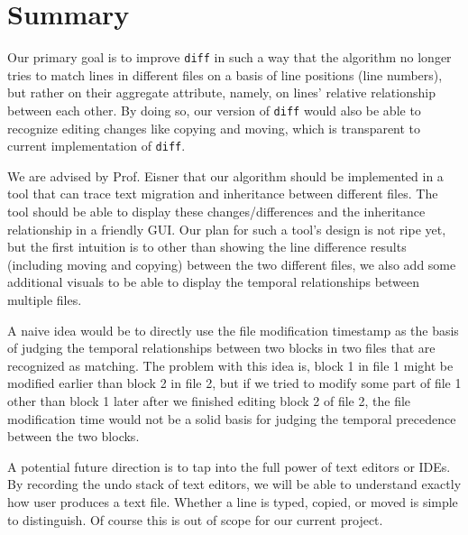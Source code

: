 \documentclass{article}
\begin{document}
\section{Summary}
Our primary goal is to improve \texttt{diff} in such a way that the algorithm no longer tries to match lines in different files on a basis of line positions (line numbers), but rather on their aggregate attribute, namely, on lines' relative relationship between each other. By doing so, our version of \texttt{diff} would also be able to recognize editing changes like copying and moving, which is transparent to current implementation of \texttt{diff}.

We are advised by Prof. Eisner that our algorithm should be implemented in a tool that can trace text migration and inheritance between different files. The tool should be able to display these changes/differences and the inheritance relationship in a friendly GUI. Our plan for such a tool's design is not ripe yet, but the first intuition is to other than showing the line difference results (including moving and copying) between the two different files, we also add some additional visuals to be able to display the temporal relationships between multiple files. 

A naive idea would be to directly use the file modification timestamp as the basis of judging the temporal relationships between two blocks in two files that are recognized as matching.
The problem with this idea is, block 1 in file 1 might be modified earlier than block 2 in file 2, but if we tried to modify some part of file 1 other than block 1 later after we finished editing block 2 of file 2, the file modification time would not be a solid basis for judging the temporal precedence between the two blocks.

A potential future direction is to tap into the full power of text editors or IDEs. By recording the undo stack of text editors, we will be able to understand exactly how user produces a text file. Whether a line is typed, copied, or moved is simple to distinguish. Of course this is out of scope for our current project.

\end{document}
